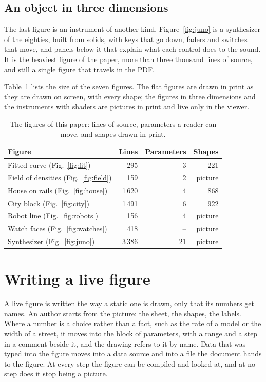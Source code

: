 \documentclass[10pt,twocolumn]{article}
\begin{document}
\subsection{An object in three dimensions}

The last figure is an instrument of another kind. Figure~\ref{fig:juno} is a synthesizer of the eighties, built from solids, with keys
that go down, faders and switches that move, and panels below it that explain what each control does to the sound. It is the heaviest
figure of the paper, more than three thousand lines of source, and still a single figure that travels in the PDF.

Table~\ref{tab:figures} lists the size of the seven figures. The flat figures are drawn in print as they are drawn on screen, with
every shape; the figures in three dimensions and the instruments with shaders are pictures in print and live only in the viewer.

\begin{table}[t]
\centering
\caption{The figures of this paper: lines of source, parameters a reader can move, and shapes drawn in print.}
\label{tab:figures}
\small
\begin{tabular}{@{}lrrr@{}}
\toprule
Figure & Lines & Parameters & Shapes \\
\midrule
Fitted curve (Fig.~\ref{fig:fit}) & 295 & 3 & 221 \\
Field of densities (Fig.~\ref{fig:field}) & 159 & 2 & picture \\
House on rails (Fig.~\ref{fig:house}) & 1\,620 & 4 & 868 \\
City block (Fig.~\ref{fig:city}) & 1\,491 & 6 & 922 \\
Robot line (Fig.~\ref{fig:robots}) & 156 & 4 & picture \\
Watch faces (Fig.~\ref{fig:watches}) & 418 & -- & picture \\
Synthesizer (Fig.~\ref{fig:juno}) & 3\,386 & 21 & picture \\
\bottomrule
\end{tabular}
\end{table}

\section{Writing a live figure}

A live figure is written the way a static one is drawn, only that its numbers get names. An author starts from the picture: the sheet,
the shapes, the labels. Where a number is a choice rather than a fact, such as the rate of a model or the width of a street, it moves
into the block of parameters, with a range and a step in a comment beside it, and the drawing refers to it by name. Data that was typed
into the figure moves into a data source and into a file the document hands to the figure. At every step the figure can be compiled
and looked at, and at no step does it stop being a picture.
\end{document}
